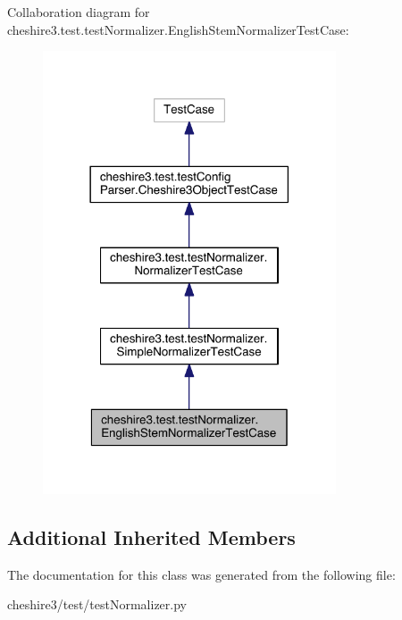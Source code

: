 Collaboration diagram for cheshire3.\-test.\-test\-Normalizer.\-English\-Stem\-Normalizer\-Test\-Case\-:
\nopagebreak
\begin{figure}[H]
\begin{center}
\leavevmode
\includegraphics[width=246pt]{classcheshire3_1_1test_1_1test_normalizer_1_1_english_stem_normalizer_test_case__coll__graph}
\end{center}
\end{figure}
\subsection*{Additional Inherited Members}


The documentation for this class was generated from the following file\-:\begin{DoxyCompactItemize}
\item 
cheshire3/test/test\-Normalizer.\-py\end{DoxyCompactItemize}
